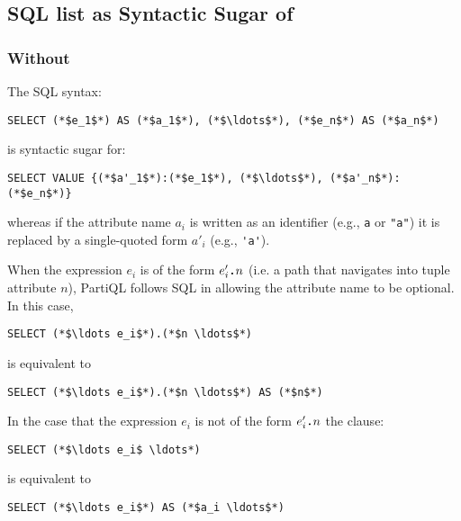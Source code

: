 \subsection{SQL \select list as Syntactic Sugar of \select {}}
\label{sec:sql-select}

\subsubsection{\select Without \gl{*}}
\label{sec:select-without-star}

The SQL syntax:

\begin{lstlisting}
SELECT (*$e_1$*) AS (*$a_1$*), (*$\ldots$*), (*$e_n$*) AS (*$a_n$*)
\end{lstlisting}

\noindent is syntactic sugar for:

\begin{lstlisting}
SELECT VALUE {(*$a'_1$*):(*$e_1$*), (*$\ldots$*), (*$a'_n$*):(*$e_n$*)}
\end{lstlisting}    

\noindent whereas if the attribute name $a_i$ is written as an identifier (e.g.,
\lstinline|a| or \lstinline|"a"|) it is replaced by a single-quoted form $a'_i$
(e.g., \lstinline|'a'|).

When the expression $e_i$ is of the form $e_i'\texttt{\textbf{.}}n$ (i.e. a path that
navigates into tuple attribute $n$), PartiQL follows SQL in allowing the
attribute name to be optional. In this case, 

\begin{lstlisting}
SELECT (*$\ldots e_i$*).(*$n \ldots$*)
\end{lstlisting}

\noindent is equivalent to 

\begin{lstlisting}
SELECT (*$\ldots e_i$*).(*$n \ldots$*) AS (*$n$*)
\end{lstlisting}

In the case that the expression $e_i$ is not of the form $e_i'\texttt{\textbf{.}}n$ the
clause:

\begin{lstlisting}
SELECT (*$\ldots e_i$ \ldots*)
\end{lstlisting}

\noindent is equivalent to 

\begin{lstlisting}
SELECT (*$\ldots e_i$*) AS (*$a_i \ldots$*)
\end{lstlisting}

